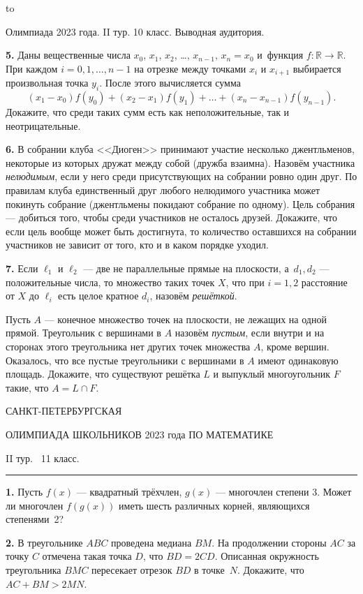 \documentclass[12pt]{article}
\def\q#1.{{\bf #1. }}
\def\dotline{\smallskip\hbox to \hsize{\dotfill}\medskip}
\begin{document}
\dotline

\centerline{Олимпиада 2023 года. II тур. 10 класс. Выводная аудитория.}
\smallskip

\q5. Даны вещественные числа $x_0$, $x_1$, $x_2$, \dots, $x_{n-1}$, $x_n=x_0$
и~функция $f\colon \mathbb{R}\to \mathbb{R}$. При каждом $i=0,1,\dots,n-1$ на отрезке между
точками $x_i$ и $x_{i+1}$ выбирается произвольная точка $y_i$. После этого
вычисляется сумма
$$
(x_1-x_0)f(y_0)+(x_2-x_1)f(y_1)+\ldots+(x_n-x_{n-1})f(y_{n-1}).
$$ 
Докажите, что среди таких сумм есть как неположительные, так и неотрицательные.

\q6. В собрании клуба <<Диоген>> принимают участие несколько джентльменов, некоторые из которых дружат между собой
(дружба взаимна). Назовём участника \emph{нелюдимым}, если у него среди присутствующих на собрании ровно один друг. По
правилам клуба единственный друг любого нелюдимого участника  может покинуть собрание (джентльмены покидают собрание по
одному). Цель собрания --- добиться того, чтобы среди участников не осталось друзей. Докажите, что если цель вообще может быть достигнута, то количество оставшихся на собрании участников не зависит от того, кто и в каком порядке уходил.

\q7. Если $\ell_1$ и $\ell_2$ --- две не параллельные прямые на плоскости, а~$d_1,d_2$ --- положительные
числа, то множество таких точек $X$, что  при $i=1,2$ расстояние от $X$ до $\ell_i$ есть целое кратное
$d_i$, назовём \emph{решёткой}.

Пусть $A$ --- конечное множество точек на плоскости, не лежащих на одной прямой.
Треугольник с вершинами в $A$ назовём \emph{пустым}, если внутри и на сторонах
этого треугольника нет других точек множества $A$, кроме вершин.
Оказалось, что все пустые треугольники с вершинами в $A$ имеют одинаковую площадь. 
Докажите, что существуют решётка $L$ и выпуклый многоугольник $F$ такие, что $A=L\cap F$.


\clearpage

\centerline{\sc САНКТ-ПЕТЕРБУРГСКАЯ}
\centerline{\sc ОЛИМПИАДА ШКОЛЬНИКОВ 2023 года ПО МАТЕМАТИКЕ}
\centerline{\sc II тур. \ 11 класс.}
\medskip
\hrule
\bigskip

\q1. Пусть $f(x)$ --- квадратный трёхчлен, $g(x)$ --- многочлен степени 3. Может ли многочлен $f(g(x))$ иметь шесть различных корней, являющихся степенями~2? 
 
\q2. В треугольнике $ABC$ проведена медиана $BM$. На продолжении стороны $AC$ за точку $C$ отмечена такая точка $D$, что $BD=2CD$. Описанная окружность треугольника $BMC$ пересекает отрезок $BD$ в точке~$N$. Докажите, что $AC+BM>2MN$.
 
\end{document}

